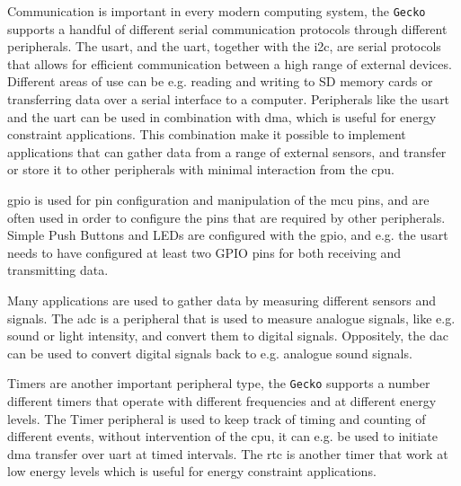 Communication is important in every modern computing system, the \texttt{Gecko} supports a handful of different serial communication protocols through different peripherals.
The \gls{usart}, and the \gls{uart}, together with the \gls{i2c}, are serial protocols that allows for efficient communication between a high range of external devices.
Different areas of use can be e.g. reading and writing to SD memory cards or transferring data over a serial interface to a computer.
Peripherals like the \gls{usart} and the \gls{uart} can be used in combination with \gls{dma}, which is useful for energy constraint applications.
This combination make it possible to implement applications that can gather data from a range of external sensors, and transfer or store it to other peripherals with minimal interaction from the \gls{cpu}.

\gls{gpio} is used for pin configuration and manipulation of the \gls{mcu} pins, and are often used in order to configure the pins that are required by other peripherals.
Simple Push Buttons and LEDs are configured with the \gls{gpio}, and e.g. the \gls{usart} needs to have configured at least two \gls{GPIO} pins for both receiving and transmitting data.

Many applications are used to gather data by measuring different sensors and signals.
The \gls{adc} is a peripheral that is used to measure analogue signals, like e.g. sound or light intensity, and convert them to digital signals.
Oppositely, the \gls{dac} can be used to convert digital signals back to e.g. analogue sound signals.

Timers are another important peripheral type, the \texttt{Gecko} supports a number different timers that operate with different frequencies and at different energy levels.
The Timer peripheral is used to keep track of timing and counting of different events, without intervention of the \gls{cpu}, it can e.g. be used to initiate \gls{dma} transfer over \gls{uart} at timed intervals.
The \gls{rtc} is another timer that work at low energy levels which is useful for energy constraint applications.
